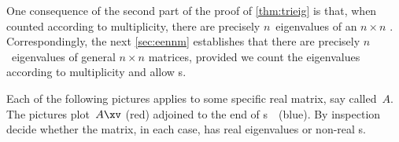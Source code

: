 One consequence of the second part of the proof of \cref{thm:trieig} is that, when counted according to multiplicity, there are precisely \(n\)~eigenvalues of an \(n\times n\) .
Correspondingly, the next \cref{sec:eennm} establishes that there are precisely \(n\)~eigenvalues of general \(n\times n\) matrices, provided we count the eigenvalues according to multiplicity and allow s.









\sectionExercises

\begin{exercise}  
Each of the following pictures applies to some specific real matrix, say called~\(A\).
The pictures plot~\(A\xv\) (red) adjoined to the end of s~\xv\ (blue).
By inspection decide whether the matrix, in each case, has real eigenvalues or non-real s.

\begin{Parts}
\begin{OmitV1}
\item {}

\item {}

\item {}

\item {}
\end{OmitV1}

\item {}

\item {}

\item {}

\item {}

\end{Parts}
\end{exercise}








